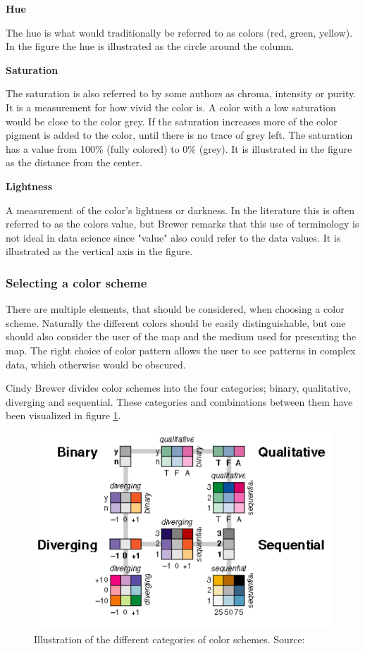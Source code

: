 \textbf{Hue}

The hue is what would traditionally be referred to as colors (red, green, yellow). In the figure the hue is illustrated as the circle around the column.

\textbf{Saturation}

The saturation is also referred to by some authors as chroma, intensity or purity. It is a measurement for how vivid the color is. A color with a low saturation would be close to the color grey. If the saturation increases more of the color pigment is added to the color, until there is no trace of grey left. The saturation has a value from 100\% (fully colored) to 0\% (grey). It is illustrated in the figure as the distance from the center.

\textbf{Lightness}

A measurement of the color’s lightness or darkness. In the literature this is often referred to as the colors value, but Brewer remarks that this use of terminology is not ideal in data science since "value" also could refer to the data values. It is illustrated as the vertical axis in the figure.  \citep{Dent}

 
\subsubsection{Selecting a color scheme}
There are multiple elements, that should be considered, when choosing a color scheme.
Naturally the different colors should be easily distinguishable, but one should also consider the user of the map and the medium used for presenting the map. The right choice of color pattern allows the user to see patterns in complex data, which otherwise would be obscured. 


Cindy Brewer divides color schemes into the four categories; binary, qualitative, diverging and sequential. These categories and combinations between them have been visualized in figure \ref{BrewerDataTypes}. \citep{Brewer94}

\begin{figure} [H]
	\centering
	\includegraphics[width=.8\textwidth]{Pictures/BrewerDataTypes}
	\caption{Illustration of the different categories of color schemes. Source: \citet{ColorGuidelines}}
	\label{BrewerDataTypes}
\end{figure}
 

